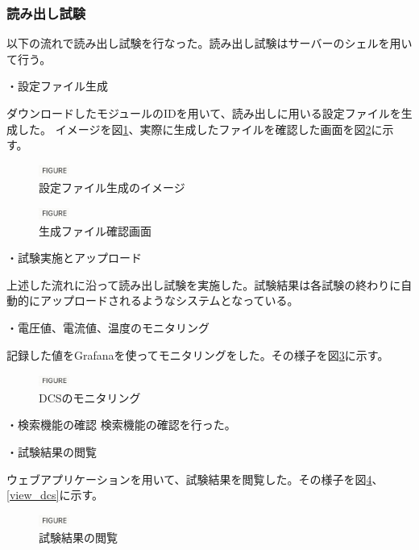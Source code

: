 \subsubsection{読み出し試験}
以下の流れで読み出し試験を行なった。読み出し試験はサーバーのシェルを用いて行う。

・設定ファイル生成

ダウンロードしたモジュールのIDを用いて、読み出しに用いる設定ファイルを生成した。
イメージを図\ref{config_retriever}、実際に生成したファイルを確認した画面を図\ref{create_config}に示す。

\begin{figure}[bpt]\centering
\includegraphics[width=1cm]{figure}
\caption[設定ファイル生成のイメージ]{設定ファイル生成のイメージ}
\label{config_retriever}
\end{figure}

\begin{figure}[bpt]\centering
\includegraphics[width=1cm]{figure}
\caption[生成ファイル確認画面]{生成ファイル確認画面}
\label{create_config}
\end{figure}

・試験実施とアップロード

上述した流れに沿って読み出し試験を実施した。試験結果は各試験の終わりに自動的にアップロードされるようなシステムとなっている。

・電圧値、電流値、温度のモニタリング

記録した値をGrafanaを使ってモニタリングをした。その様子を図\ref{monitoring_dcs}に示す。

\begin{figure}[bpt]\centering
\includegraphics[width=1cm]{figure}
\caption[DCSのモニタリング]{DCSのモニタリング}
\label{monitoring_dcs}
\end{figure}

・検索機能の確認
検索機能の確認を行った。

・試験結果の閲覧

ウェブアプリケーションを用いて、試験結果を閲覧した。その様子を図\ref{view_scan_result}、\ref{view_dcs}に示す。

\begin{figure}[bpt]\centering
\includegraphics[width=1cm]{figure}
\caption[試験結果の閲覧]{試験結果の閲覧}
\label{view_scan_result}
\end{figure}

